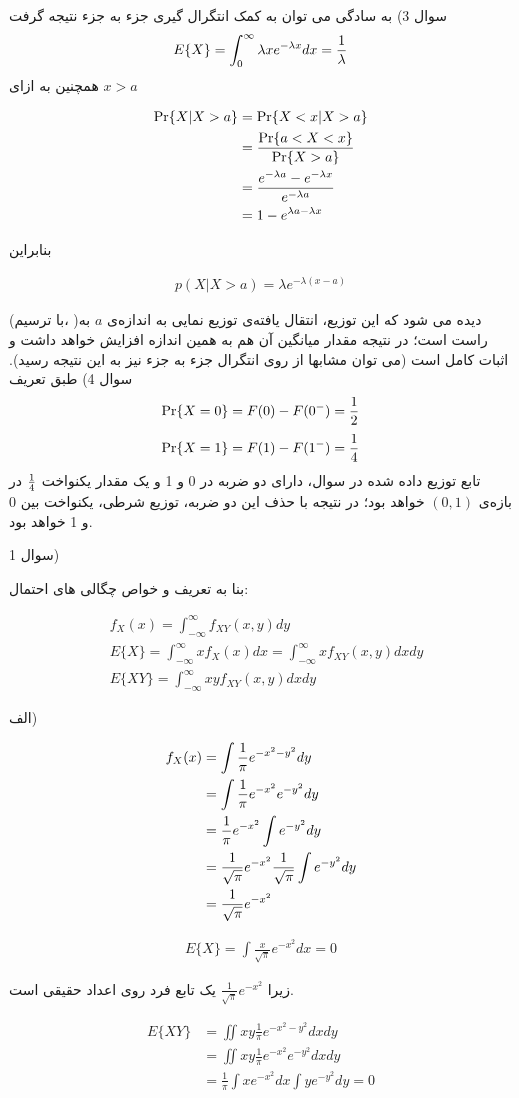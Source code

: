 \documentclass[10pt,letterpaper]{report}
\newcommand{\eqn}[1]{
\[\begin{split}
#1
\end{split}\]
}
\begin{document}
\newline\newline
سوال 3) به سادگی می توان به کمک انتگرال گیری جزء به جزء نتیجه گرفت
$$
E\{X\}=\int_0^\infty \lambda x e^{-\lambda x}dx={1\over \lambda}
$$
همچنین به ازای $x>a$
\eqn{
\Pr\{X|X>a\}&=\Pr\{X<x|X>a\}
\\&={\Pr\{a<X<x\}\over \Pr\{X>a\}}
\\&={e^{-\lambda a}-e^{-\lambda x}\over e^{-\lambda a}}
\\&={1-e^{\lambda a-\lambda x}}
}
بنابراین
\eqn{
p(X|X>a)=\lambda e^{-\lambda (x-a)}
}
(با ترسیم، )دیده می شود که این توزیع، انتقال یافته‌ی توزیع نمایی به اندازه‌ی $a$ به راست است؛ در نتیجه مقدار میانگین آن هم به همین اندازه افزایش خواهد داشت و اثبات کامل است (می توان مشابها از روی انتگرال جزء به جزء نیز به این نتیجه رسید).
\newline\newline
سوال 4) طبق تعریف
$$
\Pr\{X=0\}=F(0)-F(0^-)={1\over 2}
$$
$$
\Pr\{X=1\}=F(1)-F(1^-)={1\over 4}
$$
تابع توزیع داده شده در سوال، دارای دو ضربه در 0 و 1 و یک مقدار یکنواخت $1\over 4$ در بازه‌ی $(0,1)$ خواهد بود؛ در نتیجه با حذف این دو ضربه، توزیع شرطی، یکنواخت بین 0 و 1 خواهد بود.

سوال 1)

بنا به تعریف و خواص چگالی های احتمال:
\eqn{
&f_X(x)=\int_{-\infty}^\infty f_{XY}(x,y)dy
\\&E\{X\}=\int_{-\infty}^\infty xf_{X}(x)dx=\int_{-\infty}^\infty xf_{XY}(x,y)dxdy
\\&E\{XY\}=\int_{-\infty}^\infty xyf_{XY}(x,y)dxdy
}

الف) 
\eqn{
f_X(x)&=\int \frac{1}{\pi}e^{-x^2-y^2}dy
\\&=\int \frac{1}{\pi}e^{-x^2}e^{-y^2}dy
\\&=\frac{1}{\pi}e^{-x^2}\int e^{-y^2}dy
\\&=\frac{1}{\sqrt\pi}e^{-x^2}{1\over \sqrt \pi}\int e^{-y^2}dy
\\&=\frac{1}{\sqrt\pi}e^{-x^2}
}

\eqn{
E\{X\}=\int \frac{x}{\sqrt\pi}e^{-x^2} dx=0
}
زیرا $\frac{1}{\sqrt\pi}e^{-x^2}$ یک تابع فرد روی اعداد حقیقی است.

\eqn{
E\{XY\}&=\iint xy\frac{1}{\pi}e^{-x^2-y^2}dxdy
\\&=\iint xy\frac{1}{\pi}e^{-x^2}e^{-y^2}dxdy
\\&=\frac{1}{\pi}\int xe^{-x^2}dx\int ye^{-y^2}dy=0
}
\end{document}
